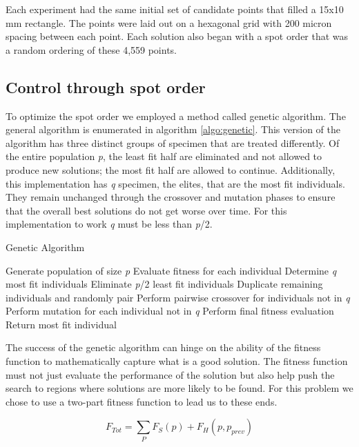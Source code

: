 \documentclass[a4paper]{article}
\begin{document}
Each experiment had the same initial set of candidate points that filled a 15x10 mm rectangle. The points were laid out on a hexagonal grid with 200 micron spacing between each point. Each solution also began with a spot order that was a random ordering of these 4,559 points. 


\subsection{Control through spot order}
\label{subsec:spotorder}

To optimize the spot order we employed a method called genetic algorithm. The general algorithm is enumerated in algorithm \ref{algo:genetic}. This version of the algorithm has three distinct groups of specimen that are treated differently. Of the entire population \textit{p}, the least fit half are eliminated and not allowed to produce new solutions; the most fit half are allowed to continue. Additionally, this implementation has \textit{q} specimen, the elites, that are the most fit individuals. They remain unchanged through the crossover and mutation phases to ensure that the overall best solutions do not get worse over time. For this implementation to work \textit{q} must be less than \textit{p}/2.


\begin{algorithm}
\caption{Genetic Algorithm}
\label{algo:genetic}
\begin{algorithmic}[1]
\State Generate population of size \textit{p}
  \State Evaluate fitness for each individual
  \State Determine \textit{q} most fit individuals
  \State Eliminate \textit{p}/2 least fit individuals
  \State Duplicate remaining individuals and randomly pair
  \State Perform pairwise crossover for individuals not in \textit{q}
  \State Perform mutation for each individual not in \textit{q}
\EndFor
\State Perform final fitness evaluation
\State Return most fit individual
\end{algorithmic}
\end{algorithm}


The success of the genetic algorithm can hinge on the ability of the fitness function to mathematically capture what is a good solution. The fitness function must not just evaluate the performance of the solution but also help push the search to regions where solutions are more likely to be found. For this problem we chose to use a two-part fitness function to lead us to these ends. 

\begin{equation}
\label{eq:fitness}
F_{Tot} = \sum_{P} F_{S}(p) + F_{H}(p, p_{prev})
\end{equation}
\end{document}
